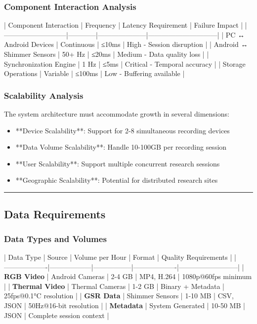 \documentclass[12pt,a4paper]{report}
\begin{document}
\subsubsection{Component Interaction Analysis}

| Component Interaction     | Frequency  | Latency Requirement | Failure Impact               |
|---------------------------|------------|---------------------|------------------------------|
| PC ↔ Android Devices      | Continuous | ≤10ms               | High - Session disruption    |
| Android ↔ Shimmer Sensors | 50+ Hz     | ≤20ms               | Medium - Data quality loss   |
| Synchronization Engine    | 1 Hz       | ≤5ms                | Critical - Temporal accuracy |
| Storage Operations        | Variable   | ≤100ms              | Low - Buffering available    |

\subsubsection{Scalability Analysis}

The system architecture must accommodate growth in several dimensions:

\begin{itemize}
\item **Device Scalability**: Support for 2-8 simultaneous recording devices
\item **Data Volume Scalability**: Handle 10-100GB per recording session
\item **User Scalability**: Support multiple concurrent research sessions
\item **Geographic Scalability**: Potential for distributed research sites

\end{itemize}
\hrule

\subsection{Data Requirements}

\subsubsection{Data Types and Volumes}

| Data Type         | Source           | Volume per Hour | Format            | Quality Requirements     |
|-------------------|------------------|-----------------|-------------------|--------------------------|
| \textbf{RGB Video}     | Android Cameras  | 2-4 GB          | MP4, H.264        | 1080p@60fps minimum      |
| \textbf{Thermal Video} | Thermal Cameras  | 1-2 GB          | Binary + Metadata | 25fps@0.1°C resolution   |
| \textbf{GSR Data}      | Shimmer Sensors  | 1-10 MB         | CSV, JSON         | 50Hz@16-bit resolution   |
| \textbf{Metadata}      | System Generated | 10-50 MB        | JSON              | Complete session context |
\end{document}
